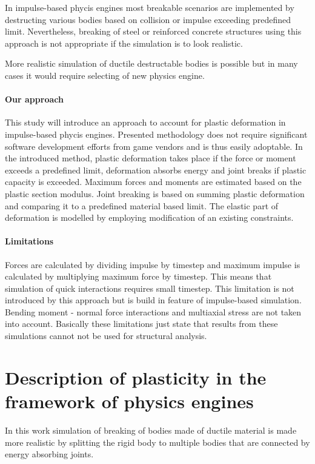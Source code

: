 \documentclass{jcgt}
\begin{document}
In impulse-based phycis engines most breakable scenarios  are implemented by destructing various bodies based on collision
or impulse exceeding predefined limit.
Nevertheless, breaking of steel or reinforced concrete structures using this approach 
is not appropriate if the simulation is to look realistic. 

More realistic simulation of ductile destructable bodies is possible but in many cases it would require selecting of new physics engine.

\paragraph{Our approach}
This study will introduce an approach to account for plastic deformation in impulse-based phycis engines.   
Presented methodology does not require significant software development efforts from
game vendors and is thus easily adoptable. 
In the introduced method, plastic deformation takes place if the force or moment exceeds a predefined 
limit, deformation absorbs energy and joint breaks if plastic capacity is exceeded. 
Maximum forces and moments are estimated based on the plastic section modulus.
Joint breaking is based on summing plastic deformation and comparing it to a
predefined material based limit. The elastic part of deformation is modelled by employing 
modification of an existing constraints.

\paragraph{Limitations}
Forces are calculated by dividing impulse by timestep and maximum impulse is calculated
by multiplying maximum force by timestep. 
This means that simulation of quick interactions requires small timestep.
This limitation is not introduced by this approach but is build in feature of impulse-based simulation.
Bending moment - normal force interactions and multiaxial stress are not taken into account. 
Basically these limitations just state that results from these simulations cannot not be used
for structural analysis.

\section{Description of plasticity in the framework of physics engines}

In this work simulation of breaking of bodies made of ductile material is made more realistic 
by splitting the rigid body
to multiple bodies that are connected by energy absorbing joints.
\end{document}
